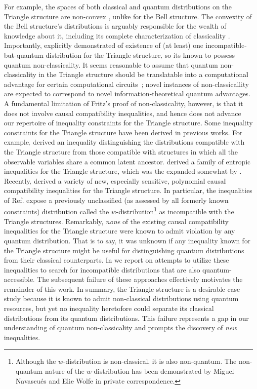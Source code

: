 \documentclass[aps, 10pt, english, twoside, pra, nofootinbib, tightenlines, longbibliography, superscriptaddress]{revtex4-1}
\begin{document}
    For example, the spaces of both classical and quantum distributions on the Triangle structure are non-convex \cite{Fritz_2012,Inflation}, unlike for the Bell structure. The convexity of the Bell structure's distributions is arguably responsible for the wealth of knowledge about it, including its complete characterization of classicality \cite{Brunner_2013}.
    Importantly, \citet{Fritz_2012} explicitly demonstrated of existence of (at least) one incompatible-but-quantum distribution for the Triangle structure, so its known to possess quantum non-classicality. It seems reasonable to assume that quantum non-classicality in the Triangle structure should be translatable into a computational advantage for certain computational circuits~\cite{Terhal_2002}; novel instances of non-classicallity are expected to correspond to novel information-theoretical quantum advantages. A fundamental limitation of Fritz's proof of non-classicality, however, is that it does not involve causal compatibility inequalities, and hence does not advance our repertoire of inequality constraints for the Triangle structure.
    Some inequality constraints for the Triangle structure have been derived in previous works. For example, \citet{Steudel_2010} derived an inequality distinguishing the distributions compatible with the Triangle structure from those compatible with structures in which all the observable variables share a common latent ancestor. \citet{Henson_2014} derived a family of entropic inequalities for the Triangle structure, which was the expanded somewhat by \citet{Weilenmann_2016}. Recently, \citet{Inflation} derived a variety of new, especially sensitive, polynomial causal compatibility inequalities for the Triangle structure. In particular, the inequalities of Ref. \cite{Inflation} expose a previously unclassified (as assessed by all formerly known constraints) distribution called the $w$-distribution\footnote{Although the $w$-distribution is non-classical, it is also non-quantum. The non-quantum nature of the $w$-distribution has been demonstrated by Miguel Navascués and Elie Wolfe in private correspondence.} as incompatible with the Triangle structures.
    Remarkably, \emph{none} of the existing causal compatibility inequalities for the Triangle structure were known to admit violation by any quantum distribution. That is to say, it was unknown if any inequality known for the Triangle structure might be useful for distinguishing quantum distributions from their classical counterparts. In  we report on attempts to utilize these inequalities to search for incompatible distributions that are also quantum-accessible. The subsequent failure of these approaches effectively motivates the remainder of this work.
    In summary, the Triangle structure is a desirable case study because it is known to admit non-classical distributions using quantum resources, but yet no inequality heretofore could separate its classical distributions from its quantum distributions. This failure represents a gap in our understanding of quantum non-classicality and prompts the discovery of \textit{new} inequalities.
\end{document}
